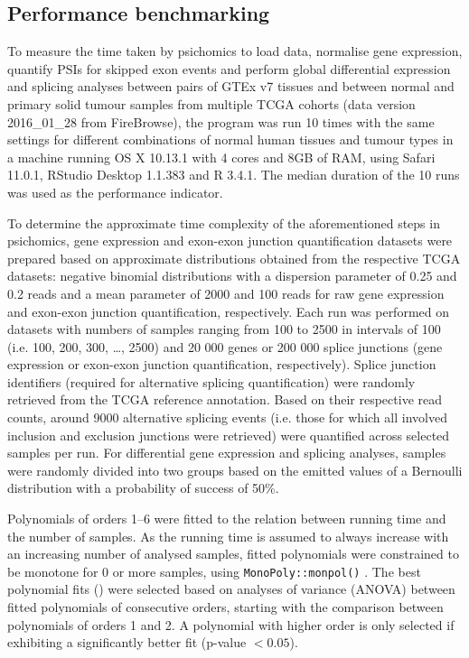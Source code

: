 \subsection{Performance benchmarking}

To measure the time taken by psichomics to load data, normalise gene expression, quantify PSIs for skipped exon events and perform global differential expression and splicing analyses between pairs of GTEx v7 tissues and between normal and primary solid tumour samples from multiple TCGA cohorts (data version 2016\_01\_28 from FireBrowse), the program was run 10 times with the same settings for different combinations of normal human tissues and tumour types in a machine running OS X 10.13.1 with 4 cores and 8GB of RAM, using Safari 11.0.1, RStudio Desktop 1.1.383 and R 3.4.1. The median duration of the 10 runs was used as the performance indicator.

To determine the approximate time complexity of the aforementioned steps in psichomics, gene expression and exon-exon junction quantification datasets were prepared based on approximate distributions obtained from the respective TCGA datasets: negative binomial distributions with a dispersion parameter of 0.25 and 0.2 reads and a mean parameter of 2000 and 100 reads for raw gene expression and exon-exon junction quantification, respectively. Each run was performed on datasets with numbers of samples ranging from 100 to 2500 in intervals of 100 (i.e. 100, 200, 300, …, 2500) and 20 000 genes or 200 000 splice junctions (gene expression or exon-exon junction quantification, respectively). Splice junction identifiers (required for alternative splicing quantification) were randomly retrieved from the TCGA reference annotation. Based on their respective read counts, around 9000 alternative splicing events (i.e. those for which all involved inclusion and exclusion junctions were retrieved) were quantified across selected samples per run. For differential gene expression and splicing analyses, samples were randomly divided into two groups based on the emitted values of a Bernoulli distribution with a probability of success of 50\%.

Polynomials of orders 1–6 were fitted to the relation between running time and the number of samples. As the running time is assumed to always increase with an increasing number of analysed samples, fitted polynomials were constrained to be monotone for 0 or more samples, using \texttt{MonoPoly::monpol()} \cite{murray:2016um}. The best polynomial fits () were selected based on analyses of variance (ANOVA) between fitted polynomials of consecutive orders, starting with the comparison between polynomials of orders 1 and 2. A polynomial with higher order is only selected if exhibiting a significantly better fit (p-value $< 0.05$).

